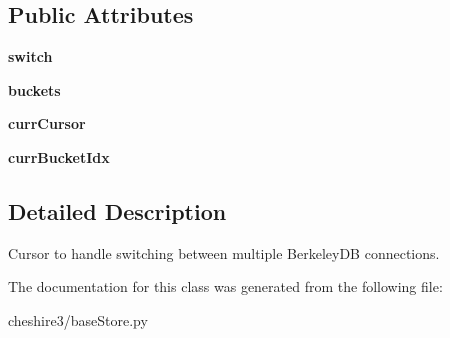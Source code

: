 \subsection*{Public Attributes}
\begin{DoxyCompactItemize}
\item 
\hypertarget{classcheshire3_1_1base_store_1_1_switching_bdb_cursor_ac210057fc19138ac8b1ff2ce871beb2e}{{\bfseries switch}}\label{classcheshire3_1_1base_store_1_1_switching_bdb_cursor_ac210057fc19138ac8b1ff2ce871beb2e}

\item 
\hypertarget{classcheshire3_1_1base_store_1_1_switching_bdb_cursor_a1c2384eb9880c9dd14cea9ca1727877c}{{\bfseries buckets}}\label{classcheshire3_1_1base_store_1_1_switching_bdb_cursor_a1c2384eb9880c9dd14cea9ca1727877c}

\item 
\hypertarget{classcheshire3_1_1base_store_1_1_switching_bdb_cursor_afa39b3aa45da25859e874c40960f1dab}{{\bfseries curr\-Cursor}}\label{classcheshire3_1_1base_store_1_1_switching_bdb_cursor_afa39b3aa45da25859e874c40960f1dab}

\item 
\hypertarget{classcheshire3_1_1base_store_1_1_switching_bdb_cursor_a26a87e5b2b5b47e2d48df77196cba240}{{\bfseries curr\-Bucket\-Idx}}\label{classcheshire3_1_1base_store_1_1_switching_bdb_cursor_a26a87e5b2b5b47e2d48df77196cba240}

\end{DoxyCompactItemize}


\subsection{Detailed Description}
\begin{DoxyVerb}Cursor to handle switching between multiple BerkeleyDB connections.\end{DoxyVerb}
 

The documentation for this class was generated from the following file\-:\begin{DoxyCompactItemize}
\item 
cheshire3/base\-Store.\-py\end{DoxyCompactItemize}
